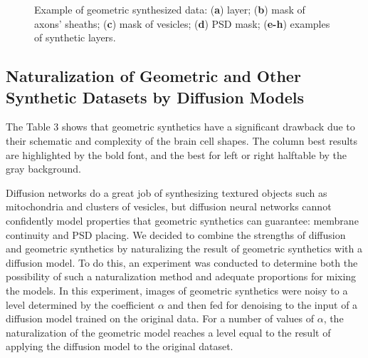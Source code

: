 \documentclass[journal,article,submit,pdftex,moreauthors]{Definitions/mdpi}
\begin{document}
\begin{figure}[H]
	\hspace{0.1cm}
	\hspace{0.1cm}
	\hspace{0.1cm}
	\caption{Example of geometric synthesized data: (\textbf{a}) layer; (\textbf{b}) mask of axons’ sheaths; (\textbf{c}) mask of vesicles; (\textbf{d}) PSD mask; (\textbf{e-h}) examples of synthetic layers.\label{fig8}}
\end{figure}

\subsection{Naturalization of Geometric and Other Synthetic Datasets by Diffusion Models}

The Table 3 shows that geometric synthetics have a significant drawback due to their schematic and complexity of the brain cell shapes. The column best results are highlighted by the bold font, and the best for left or right halftable by the gray background.

Diffusion networks do a great job of synthesizing textured objects such as mitochondria and clusters of vesicles, but diffusion neural networks cannot confidently model properties that geometric synthetics can guarantee: membrane continuity and PSD placing. We decided to combine the strengths of diffusion and geometric synthetics by naturalizing the result of geometric synthetics with a diffusion model. To do this, an experiment was conducted to determine both the possibility of such a naturalization method and adequate proportions for mixing the models. In this experiment, images of geometric synthetics were noisy to a level determined by the coefficient $\alpha$ and then fed for denoising to the input of a diffusion model trained on the original data. For a number of values of $\alpha$, the naturalization of the geometric model reaches a level equal to the result of applying the diffusion model to the original dataset.
\end{document}
